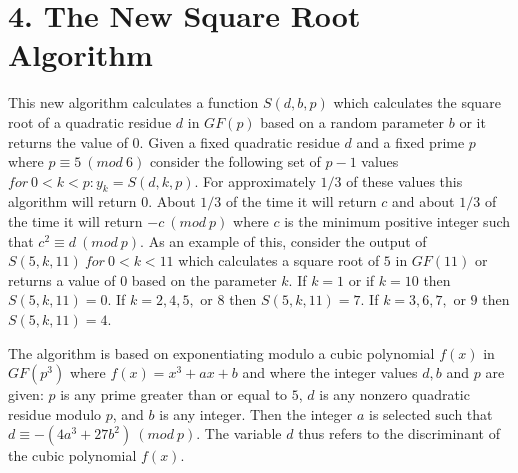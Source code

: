 \documentclass[final,letterpaper,oneside,10pt]{article}
\begin{document}
\section*{4. The New Square Root Algorithm}

This new algorithm calculates a function $S(d,b,p)$ which calculates the square root of a quadratic residue $d$ in $GF(p)$  based on a random
parameter $b$ or it returns the value of $0$.  Given a fixed quadratic residue $d$ and a fixed prime $p$ where $p \equiv 5~(mod~6)$ consider
the following set of $p-1$ values $for~ 0<k<p : y_k = S(d,k,p)$.  For approximately $1/3$ of these values this algorithm will return $0$.
About $1/3$ of the time it will return $c$ and about $1/3$ of the time it will return $-c~(mod~p)$ where $c$ is the minimum positive integer 
such that $c^2 \equiv d~(mod~p)$.  As an example of this, consider the output of $S(5,k,11)~ for~ 0<k<11$ which calculates a square root of $5$
in $GF(11)$ or returns a value of $0$ based on the parameter $k$.  If $k=1$ or if $k=10$ then $S(5,k,11)=0$.  If $k=2,4,5,$ or $8$ then
$S(5,k,11) = 7$.  If $k=3,6,7,$ or $9$ then $S(5,k,11)=4$.

The algorithm is based on exponentiating modulo a cubic polynomial $f(x)$ in $GF(p^3)$ where $f(x)=x^3+ax+b$ and where the integer values 
$d,b$ and $p$ are given: $p$ is any prime greater than or equal to $5$, $d$ is any nonzero quadratic residue modulo $p$, and $b$ is any integer.
Then the integer $a$ is selected such that $d \equiv -(4a^3+27b^2)~(mod~p)$.  The variable $d$ thus refers to the discriminant of the cubic
polynomial $f(x)$.
\end{document}
